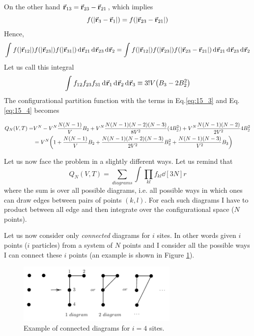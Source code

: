 \documentclass[../../Main/Main.tex]{subfiles}
\begin{document}
\noindent On the other hand \( \va{r}_{13} = \va{r}_{23} - \va{r}_{21} \), which implies
\begin{equation*}
   f ( \abs{\va{r}_3 - \va{r}_1} )  =  f ( \abs{\va{r}_{23} - \va{r}_{21}} )
\end{equation*}
Hence,
\begin{equation*}
  \int_{}^{} f (\abs{\va{r}_{12}} ) f (\abs{\va{r}_{23}} ) f (\abs{\va{r}_{31}} ) \dd[]{\va{r}_{21}}  \dd[]{\va{r}_{23}}  \dd[]{\va{r}_{2}}
   =  \int_{}^{} f (\abs{\va{r}_{12}} ) f (\abs{\va{r}_{23}} ) f (\abs{\va{r}_{23}-\va{r}_{21}} )  \dd[]{\va{r}_{21}}  \dd[]{\va{r}_{23}}  \dd[]{\va{r}_{2}}
\end{equation*}
Let us call this integral
\begin{equation}
  \int_{}^{} f_{12} f_{23} f_{31} \dd[]{\va{r}_1}  \dd[]{\va{r}_2}   \dd[]{\va{r}_3}
  \equiv  3! V  \qty( B_3 - 2 B_2^2  )
  \label{eq:15_4}
\end{equation}
The configurational partition function with the terms in Eq.\ref{eq:15_3} and Eq.\ref{eq:15_4} becomes
\begin{small}
\begin{equation}
\begin{split}
Q_N (V,T) = &  V^N - V^N \frac{N(N-1)}{V} B_2 + V^N\frac{ N (N-1)(N-2)(N-3)}{8V^2} (4B_2^2)
 + V^N \frac{N(N-1)(N-2)}{2V^2} 4B_2^2 \\
& = V^N \qty(1 + \frac{N(N-1)}{V} B_2 + \frac{N(N-1)(N-2)(N-3)}{2V^2} B_2^2 + \frac{N(N-1)(N-3)}{V^2} B_3)
\end{split}
\end{equation}
\end{small}

Let us now face the problem in a slightly different ways. Let us remind that
\begin{equation}
  Q_N (V,T) = \sum_{diagrams}^{} \int_{}^{} \prod_{kl}^{} f_{kl} \dd[3N]{r}
\end{equation}
where the sum is over all possible diagrams, i.e. all possible ways in which ones can draw edges between pairs of points \( (k,l) \).
For each such diagrams I have to product between all edge and then integrate over the configurational space (\( N \)  points).

 Let us now consider only \emph{connected} diagrams for \( i \) sites. In other words given \( i \) points (\( i \) particles)  from a system of \( N \) points and I consider all the possible ways I can connect these \( i  \) points (an example is shown in Figure \ref{fig:15_6}).
\begin{figure}[H]
   \centering
   \includegraphics[width=0.7\textwidth]{./img/9__1.pdf}
   \caption{\label{fig:15_6} Example of connected diagrams for \( i=4 \) sites.}
   \end{figure}
\end{document}
